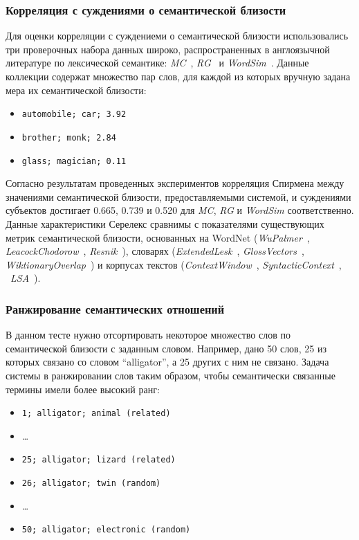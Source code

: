 \documentclass[a4paper,10pt,twoside]{article}
\begin{document}
\subsubsection{Корреляция с суждениями о семантической близости} Для оценки корреляции с суждениеми о семантической близости использовались три проверочных набора данных широко, распространенных в англоязычной литературе по лексической семантике: \textit{MC}~\cite{miller1993semantic}, \textit{RG}~\cite{rubenstein1965} и \textit{WordSim}~\cite{finkelstein2001placing}. Данные коллекции содержат множество пар слов, для каждой из которых вручную задана мера их семантической близости:
\begin{itemize}
  \footnotesize
  \item \texttt{automobile; car; 3.92}
  \item \texttt{brother; monk; 2.84}
  \item \texttt{glass; magician; 0.11}
\end{itemize}

 Согласно результатам проведенных экспериментов корреляция Спирмена между значениями семантической близости, предоставляемыми системой, и суждениями субъектов достигает 
0.665, 0.739 и 0.520 для \textit{MC}, \textit{RG} и \textit{WordSim} соответственно. Данные характеристики Серелекс сравнимы с показателями существующих метрик семантической близости, основанных на WordNet (\textit{WuPalmer}~\cite{wu1994verbs}, \textit{LeacockChodorow}~\cite{leacock1998}, \textit{Resnik}~\cite{resnik1995}), словарях (\textit{ExtendedLesk}~\cite{banerjee2003extended}, \textit{GlossVectors}~\cite{patwardhan2006using}, \textit{WiktionaryOverlap}~\cite{zesch2008extracting}) и  корпусах текстов (\textit{ContextWindow}~\cite{cruys2010mining}, \textit{SyntacticContext}~\cite{cruys2010mining}, ~\textit{LSA}~\cite{landauer1998introduction}).

\subsubsection{Ранжирование семантических отношений}

В данном тесте нужно отсортировать некоторое множество слов по семантической близости с заданным словом. Например, дано 50 слов, 25 из которых связано со словом ``alligator'', а 25 других с ним не связано. Задача системы в ранжировании слов таким образом, чтобы семантически связанные термины имели более высокий ранг:

\begin{itemize}
\footnotesize
\item \texttt{1; alligator; animal (related)}
\item \ldots
\item \texttt{25; alligator; lizard (related)}
\item \texttt{26; alligator; twin (random)}
\item \ldots
\item \texttt{50; alligator; electronic (random) }
\end{itemize}
\end{document}
